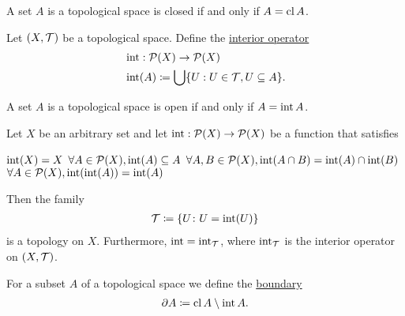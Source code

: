 \begin{proposition}\label{thm:set_open_iff_matches_interior}
  A set $A$ is a topological space is closed if and only if $A = \operatorname{cl} A$.
\end{proposition}

\begin{definition}\label{def:interior_operator}\cite[15]{Engelking1989}
  Let $(X, \mathcal T)$ be a topological space. Define the \ul{interior operator}
  \begin{align*}
    &\operatorname{int}: \operatorname{\mathcal P}(X) \to \operatorname{\mathcal P}(X) \\
    &\operatorname{int}(A) \coloneqq \bigcup \{ U : U \in \mathcal T, U \subseteq A \}.
  \end{align*}
\end{definition}

\begin{proposition}\label{thm:set_open_iff_matches_interior}
  A set $A$ is a topological space is open if and only if $A = \operatorname{int} A$.
\end{proposition}

\begin{proposition}\label{thm:interior_operator_axioms}
  Let $X$ be an arbitrary set and let $\operatorname{int}: \operatorname{\mathcal P}(X) \to \operatorname{\mathcal P}(X)$ be a function that satisfies
  \begin{description}
     $\operatorname{int}(X) = X$
     $\forall A \in \operatorname{\mathcal P}(X), \operatorname{int}(A) \subseteq A$
     $\forall A, B \in \operatorname{\mathcal P}(X), \operatorname{int}(A \cap B) = \operatorname{int}(A) \cap \operatorname{int}(B)$
     $\forall A \in \operatorname{\mathcal P}(X), \operatorname{int}(\operatorname{int}(A)) = \operatorname{int}(A)$
  \end{description}

  Then the family
  \begin{align*}
    \mathcal T \coloneqq \{ U \colon U = \operatorname{int}(U) \}
  \end{align*}
  is a topology on $X$. Furthermore, $\operatorname{int} = \operatorname{int}_{\mathcal T}$, where $\operatorname{int}_{\mathcal T}$ is the interior operator on $(X, \mathcal T)$.
\end{proposition}

\begin{definition}\label{def:topological_boundary}\cite[24]{Engelking1989}
  For a subset $A$ of a topological space we define the \ul{boundary}
  \begin{align*}
    \partial A \coloneqq \operatorname{cl}{A} \setminus \operatorname{int}{A}.
  \end{align*}
\end{definition}

